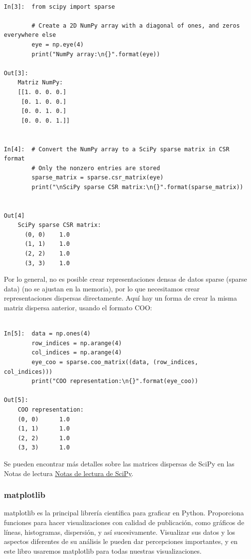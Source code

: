 \begin{lstlisting}

In[3]:  from scipy import sparse

        # Create a 2D NumPy array with a diagonal of ones, and zeros everywhere else
        eye = np.eye(4)
        print("NumPy array:\n{}".format(eye))  

Out[3]:
    Matriz NumPy:
    [[1. 0. 0. 0.]
     [0. 1. 0. 0.]
     [0. 0. 1. 0.]
     [0. 0. 0. 1.]]    


In[4]:  # Convert the NumPy array to a SciPy sparse matrix in CSR format
        # Only the nonzero entries are stored
        sparse_matrix = sparse.csr_matrix(eye)
        print("\nSciPy sparse CSR matrix:\n{}".format(sparse_matrix))


Out[4]
    SciPy sparse CSR matrix:
      (0, 0)    1.0
      (1, 1)    1.0
      (2, 2)    1.0
      (3, 3)    1.0
\end{lstlisting}

Por lo general, no es posible crear representaciones densas de datos sparse (sparse data) 
(no se ajustan en la memoria), por lo que necesitamos crear representaciones dispersas directamente. Aquí hay un forma de crear la misma matriz dispersa anterior, usando el formato COO:\\

\begin{lstlisting}

In[5]:  data = np.ones(4)
        row_indices = np.arange(4)
        col_indices = np.arange(4)
        eye_coo = sparse.coo_matrix((data, (row_indices, col_indices)))
        print("COO representation:\n{}".format(eye_coo))

Out[5]:
    COO representation:
    (0, 0)      1.0
    (1, 1)      1.0
    (2, 2)      1.0
    (3, 3)      1.0

\end{lstlisting}

Se pueden encontrar más detalles sobre las matrices dispersas de SciPy en las Notas de lectura
\href{http://scipy-lectures.org/}{\color{vino} Notas de lectura de SciPy}.              %

\subsubsection{matplotlib}

{\ttfamily matplotlib}  es la principal librería científica para graficar en Python. Proporciona funciones para hacer visualizaciones con calidad de publicación, como gráficos de líneas, histogramas, dispersión, y así sucesivamente.  Visualizar sus datos y los aspectos diferentes de su análisis le pueden dar  percepciones importantes, y en este libro usaremos matplotlib para todas nuestras visualizaciones. 

